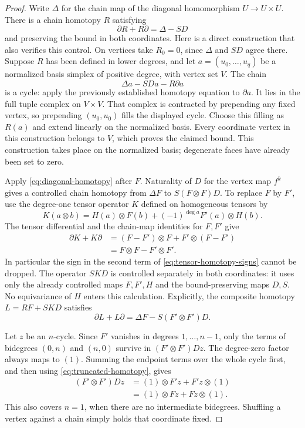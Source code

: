 \begin{proof}
Write $\Delta$ for the chain map of the diagonal homomorphism
$U\to U\times U$.  There is a chain homotopy $R$ satisfying
\begin{equation}\label{eq:diagonal-homotopy}
 \partial R+R\partial=\Delta-SD
\end{equation}
and preserving the bound in both coordinates.  Here is a direct
construction that also verifies this control.  On vertices take
$R_0=0$, since $\Delta$ and $SD$ agree there.  Suppose $R$ has been
defined in lower degrees, and let $a=(u_0,\ldots,u_q)$ be a
normalized basis simplex of positive degree, with vertex set $V$.
The chain
\[
 \Delta a-SDa-R\partial a
\]
is a cycle: apply the previously established homotopy equation to
$\partial a$.  It lies in the full tuple complex on $V\times V$.
That complex is contracted by prepending any fixed vertex, so
prepending $(u_0,u_0)$ fills the displayed cycle.  Choose this filling
as $R(a)$ and extend linearly on the normalized basis.  Every
coordinate vertex in this construction belongs to $V$, which proves
the claimed bound.  This construction takes place on the normalized
basis; degenerate faces have already been set to zero.

Apply \eqref{eq:diagonal-homotopy} after $F$.  Naturality of $D$
for the vertex map $f^k$ gives a controlled chain homotopy from
$\Delta F$ to $S(F\otimes F)D$.  To replace $F$ by $F'$, use the
degree-one tensor operator $K$ defined on homogeneous tensors by
\begin{equation}\label{eq:tensor-homotopy-signs}
 K(a\otimes b)
     =H(a)\otimes F(b)+(-1)^{\deg a}F'(a)\otimes H(b).
\end{equation}
The tensor differential and the chain-map identities for $F,F'$
give
\begin{align*}
 \partial K+K\partial
   &=(F-F')\otimes F+F'\otimes(F-F')\\
   &=F\otimes F-F'\otimes F'.
\end{align*}
In particular the sign in the second term of
\eqref{eq:tensor-homotopy-signs} cannot be dropped.  The operator
$SKD$ is controlled separately in both coordinates: it uses only
the already controlled maps $F,F',H$ and the bound-preserving maps
$D,S$.  No equivariance of $H$ enters this calculation.
Explicitly, the composite homotopy $L=RF+SKD$ satisfies
\[
 \partial L+L\partial
       =\Delta F-S(F'\otimes F')D.
\]

Let $z$ be an $n$-cycle.  Since $F'$ vanishes in degrees
$1,\ldots,n-1$, only the terms of bidegrees $(0,n)$ and $(n,0)$
survive in $(F'\otimes F')Dz$.  The degree-zero factor always maps
to $(1)$.  Summing the endpoint terms over the whole cycle first, and
then using \eqref{eq:truncated-homotopy}, gives
\[
\begin{aligned}
 (F'\otimes F')Dz
   &=(1)\otimes F'z+F'z\otimes(1)\\
   &=(1)\otimes Fz+Fz\otimes(1).
\end{aligned}
\]
This also covers $n=1$, when there are no intermediate bidegrees.
Shuffling a vertex against a chain simply holds that coordinate
fixed.


\end{proof}
